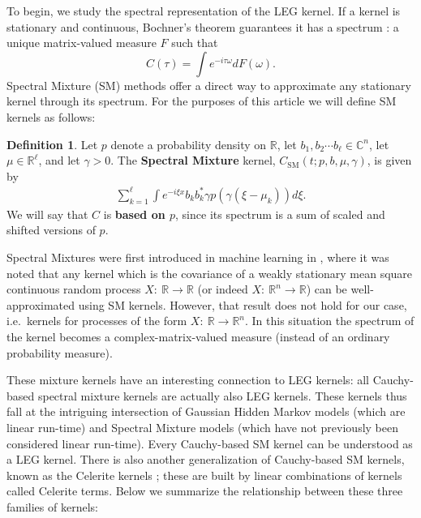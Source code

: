 \documentclass{article}
\theoremstyle{definition}
\newtheorem{definition}{Definition}
\newcommand{\SM}{\mathrm{SM}}
\begin{document}
To begin, we study the spectral representation of the LEG kernel.  If a kernel is stationary and continuous, Bochner's theorem guarantees it has a spectrum \cite{bhatia2015positive}: a unique matrix-valued measure $F$ such that
\[
C(\tau) = \int e^{-i\tau \omega } dF(\omega).
\] 
Spectral Mixture (SM) methods offer a direct way to approximate any stationary kernel through its spectrum.    For the purposes of this article we will define SM kernels as follows:  

\begin{definition}
    Let $p$ denote a probability density on $\mathbb{R}$, let $b_1, b_2 \cdots b_{\ell} \in \mathbb{C}^{n}$, let $\mu \in \mathbb{R}^{\ell}$, and let $\gamma>0$.  The \textbf{Spectral Mixture} kernel, $C_\SM(t;p,b,\mu,\gamma)$, is given by 
    \begin{gather*}
     \sum_{k=1}^{\ell}\int e^{-i\xi x}   b_k b_k^* \gamma p(\gamma(\xi - \mu_k)) d \xi.
    \end{gather*}
    We will say that $C$ is \textbf{based on $p$}, since its spectrum is a sum of scaled and shifted versions of $p$.
\end{definition}

Spectral Mixtures were first introduced in machine learning in \cite{wilson2013gaussian}, where it was noted that any kernel which is the covariance of a weakly stationary mean square continuous random process $X:\ \mathbb{R} \rightarrow\mathbb{R}$ (or indeed $X:\ \mathbb{R}^n \rightarrow\mathbb{R}$) can be well-approximated using SM kernels.    
However, that result does not hold for our case, i.e.\ kernels for processes of the form $X:\ \mathbb{R} \rightarrow\mathbb{R}^n$.  In this situation the spectrum of the kernel becomes a complex-matrix-valued measure (instead of an ordinary probability measure).

These mixture kernels have an interesting connection to LEG kernels: all Cauchy-based spectral mixture kernels are actually also LEG kernels.  These kernels thus fall at the intriguing intersection of Gaussian Hidden Markov models (which are linear run-time) and Spectral Mixture models (which have not previously been considered linear run-time).  Every Cauchy-based SM kernel can be understood as a LEG kernel.  There is also another generalization of Cauchy-based SM kernels, known as the Celerite kernels \cite{foreman2017celerite}; these are built by linear combinations of kernels called Celerite terms.  Below we summarize the relationship between these three families of kernels:
\end{document}
